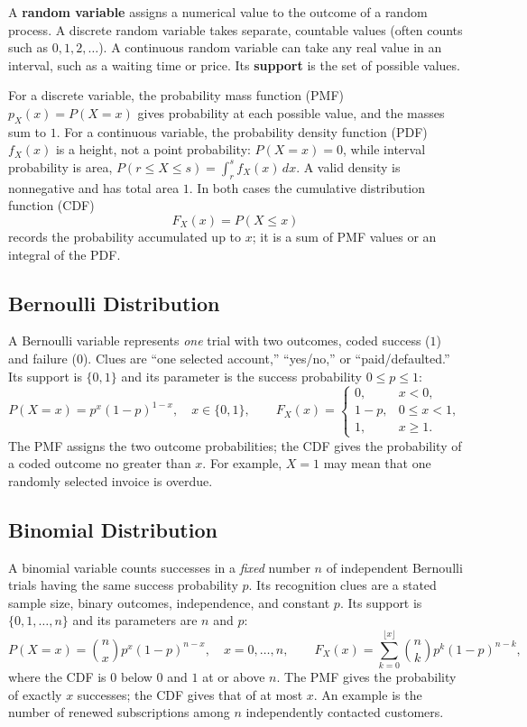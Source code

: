 	A \textbf{random variable} assigns a numerical value to the outcome of a random process. A discrete random variable takes separate, countable values (often counts such as $0,1,2,\ldots$). A continuous random variable can take any real value in an interval, such as a waiting time or price. Its \textbf{support} is the set of possible values.

	For a discrete variable, the probability mass function (PMF) $p_X(x)=P(X=x)$ gives probability at each possible value, and the masses sum to $1$. For a continuous variable, the probability density function (PDF) $f_X(x)$ is a height, not a point probability: $P(X=x)=0$, while interval probability is area, $P(r\le X\le s)=\int_r^s f_X(x)\,dx$. A valid density is nonnegative and has total area $1$. In both cases the cumulative distribution function (CDF)
	\[
		F_X(x)=P(X\le x)
	\]
	records the probability accumulated up to $x$; it is a sum of PMF values or an integral of the PDF.

	\subsection{Bernoulli Distribution}
	\label{sec:introduction-bernoulli}
	A Bernoulli variable represents \emph{one} trial with two outcomes, coded success ($1$) and failure ($0$). Clues are ``one selected account,'' ``yes/no,'' or ``paid/defaulted.'' Its support is $\{0,1\}$ and its parameter is the success probability $0\le p\le1$:
	\[
		P(X=x)=p^x(1-p)^{1-x},\quad x\in\{0,1\},
		\qquad
		F_X(x)=\begin{cases}0,&x<0,\\1-p,&0\le x<1,\\1,&x\ge1.\end{cases}
	\]
	The PMF assigns the two outcome probabilities; the CDF gives the probability of a coded outcome no greater than $x$. For example, $X=1$ may mean that one randomly selected invoice is overdue.


	\subsection{Binomial Distribution}
	\label{sec:introduction-binomial}
	A binomial variable counts successes in a \emph{fixed} number $n$ of independent Bernoulli trials having the same success probability $p$. Its recognition clues are a stated sample size, binary outcomes, independence, and constant $p$. Its support is $\{0,1,\ldots,n\}$ and its parameters are $n$ and $p$:
	\[
		P(X=x)=\binom{n}{x}p^x(1-p)^{n-x},\quad x=0,\ldots,n,
		\qquad F_X(x)=\sum_{k=0}^{\lfloor x\rfloor}\binom{n}{k}p^k(1-p)^{n-k},
	\]
	where the CDF is $0$ below $0$ and $1$ at or above $n$. The PMF gives the probability of exactly $x$ successes; the CDF gives that of at most $x$. An example is the number of renewed subscriptions among $n$ independently contacted customers.

